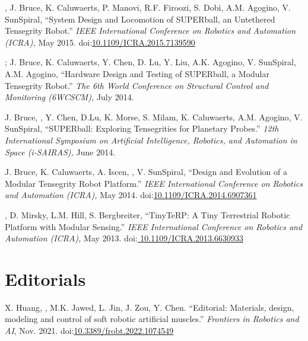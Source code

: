 \documentclass[letterpaper]{deedy-resume} %
\newcommand\doilink[1]{\href{http://dx.doi.org/#1}{#1}}
\newcommand\doi[1]{doi:\doilink{#1}}
\newcommand{\myname}{\underline{{\fontdescript{A.P. Sabelhaus}}}}
\begin{document}
{\begin{etaremune}[itemsep=0.1cm]
\item \underline{{}}, J. Bruce, K. Caluwaerts, P. Manovi, R.F. Firoozi, S. Dobi, A.M. Agogino, V. SunSpiral, ``System Design and Locomotion of SUPERball, an Untethered Tensegrity Robot.'' {\it IEEE International Conference on Robotics and Automation (ICRA),} May 2015. \doi{10.1109/ICRA.2015.7139590}

\item \underline{{}}; J. Bruce, K. Caluwaerts, Y. Chen, D. Lu, Y. Liu, A.K. Agogino, V. SunSpiral, A.M. Agogino, ``Hardware Design and Testing of SUPERball, a Modular Tensegrity Robot.'' {\it The 6th World Conference on Structural Control and Monitoring (6WCSCM),} July 2014.

\item J. Bruce, \underline{{}}, Y. Chen, D.Lu, K. Morse, S. Milam, K. Caluwaerts, A.M. Agogino, V. SunSpiral, ``SUPERball: Exploring Tensegrities for Planetary Probes.'' {\it 12th International Symposium on Artificial Intelligence, Robotics, and Automation in Space (i-SAIRAS),} June 2014.

\item J. Bruce, K. Caluwaerts, A. Iscen, \underline{{}}, V. SunSpiral, ``Design and Evolution of a Modular Tensegrity Robot Platform.'' {\it IEEE International Conference on Robotics and Automation (ICRA),} May 2014. \doi{10.1109/ICRA.2014.6907361}

\item \underline{{}}, D. Mirsky, L.M. Hill, S. Bergbreiter, ``TinyTeRP: A Tiny Terrestrial Robotic Platform with Modular Sensing.'' {\it IEEE International Conference on Robotics and Automation (ICRA),} May 2013. \doi{ 10.1109/ICRA.2013.6630933}

\end{etaremune}


\section{Editorials}
\vspace{0.2cm}

\begin{etaremune}[itemsep=0.1cm]

\item X. Huang, \myname, M.K. Jawed, L. Jin, J. Zou, Y. Chen. ``Editorial: Materials, design, modeling and control of soft robotic artificial muscles.'' {\it Frontiers in Robotics and AI}, Nov. 2021.  \doi{10.3389/frobt.2022.1074549}


\end{etaremune}}
\end{document}
